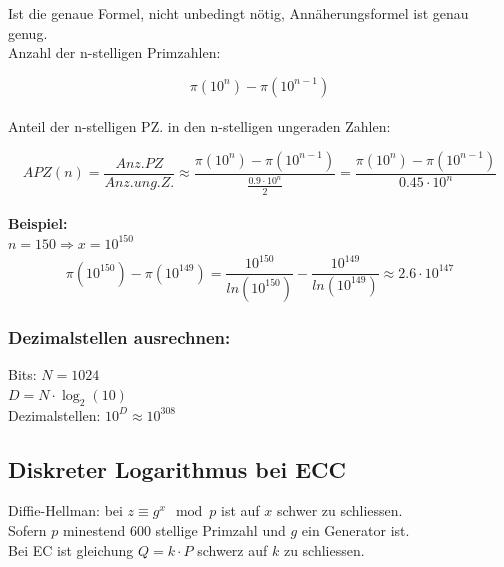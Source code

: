 \documentclass[12pt]{scrartcl}
\begin{document}
Ist die genaue Formel, nicht unbedingt nötig, Annäherungsformel ist genau genug.\\

Anzahl der n-stelligen Primzahlen:

\[ \pi(10^n) - \pi(10^{n-1})  \] \\

Anteil der n-stelligen PZ. in den n-stelligen ungeraden Zahlen:

\begin{equation*}
    APZ(n) = \frac{Anz. PZ}{Anz.ung.Z.} \approx \frac{\pi(10^n) - \pi(10^{n-1})}{\displaystyle{\frac{0.9 \cdot 10^n}{2}}} = \frac{\pi(10^n) - \pi(10^{n-1})}{0.45 \cdot 10^n}
\end{equation*} \\


\textbf{Beispiel:} \\
$n = 150 \Rightarrow x = 10^{150}$ \\

\begin{equation*}
    \pi(10^{150}) - \pi(10^{149}) = \frac{10^{150}}{ln(10^{150})} - \frac{10^{149}}{ln(10^{149})} \approx 2.6 \cdot 10^{147}
\end{equation*}


\subsubsection{Dezimalstellen ausrechnen:}

Bits: $N = 1024$\\
$D = N \cdot \log_2(10)$\\
Dezimalstellen: $10^{D} \approx 10^{308}$\\





\subsection{Diskreter Logarithmus bei ECC}

Diffie-Hellman: bei $z \equiv g^x \mod p$ ist auf $x$ schwer zu schliessen.\\
Sofern $p$ minestend 600 stellige Primzahl und $g$ ein Generator ist.\\

Bei EC ist gleichung $Q = k \cdot P$ schwerz auf $k$ zu schliessen.\\
\end{document}
